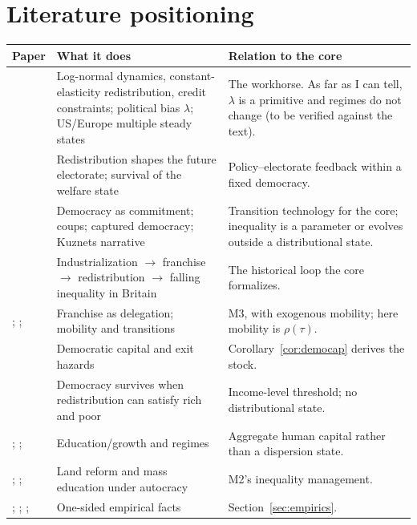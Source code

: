 \documentclass[11pt]{article}
\theoremstyle{remark}
\begin{document}
\section{Literature positioning}\label{sec:lit}

\begin{longtable}{p{}p{}p{}}
\toprule
Paper & What it does & Relation to the core\\
\midrule
\endhead
\citet{Benabou1996,Benabou2000,Benabou2002} & Log-normal dynamics, constant-elasticity redistribution, credit constraints; political bias $\lambda$; US/Europe multiple steady states & The workhorse.  As far as I can tell, $\lambda$ is a primitive and regimes do not change (to be verified against the text).\\
\citet{HasslerEtAl2003} & Redistribution shapes the future electorate; survival of the welfare state & Policy--electorate feedback within a fixed democracy.\\
\citet{AcemogluRobinson2000,AcemogluRobinson2001,AcemogluRobinson2006,AcemogluRobinson2008} & Democracy as commitment; coups; captured democracy; Kuznets narrative & Transition technology for the core; inequality is a parameter or evolves outside a distributional state.\\
\citet{JustmanGradstein1999} & Industrialization $\to$ franchise $\to$ redistribution $\to$ falling inequality in Britain & The historical loop the core formalizes.\\
\citet{JackLagunoff2006}; \citet{Leventoglu2014}; \citet{AcemogluEgorovSonin2018} & Franchise as delegation; mobility and transitions & M3, with exogenous mobility; here mobility is $\rho(\tau)$.\\
\citet{PerssonTabellini2009} & Democratic capital and exit hazards & Corollary~\ref{cor:democap} derives the stock.\\
\citet{BenhabibPrzeworski2006} & Democracy survives when redistribution can satisfy rich and poor & Income-level threshold; no distributional state.\\
\citet{BourguignonVerdier2000}; \citet{CervellatiEtAl2025}; \citet{BoucekkineEtAl2026Unified} & Education/growth and regimes & Aggregate human capital rather than a dispersion state.\\
\citet{Grossman1994}; \citet{Albertus2015}; \citet{Paglayan2021} & Land reform and mass education under autocracy & M2's inequality management.\\
\citet{DorschMaarek2019}; \citet{Houle2009}; \citet{RauStokes2024}; \citet{AcemogluEtAl2008,AcemogluEtAl2015Handbook,AcemogluEtAl2019JPE} & One-sided empirical facts & Section~\ref{sec:empirics}.\\
\bottomrule
\end{longtable}
\end{document}
